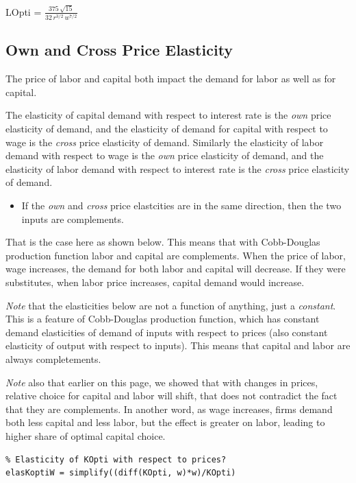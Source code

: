 \documentclass[
]{book}
\providecommand{\tightlist}{%
  \setlength{\itemsep}{0pt}\setlength{\parskip}{0pt}}
\begin{document}
LOpti = \(\displaystyle \frac{375\,\sqrt{15}}{32\,r^{3/2} \,w^{7/2} }\)

\hypertarget{own-and-cross-price-elasticity}{%
\subsection{\texorpdfstring{\textbf{Own and Cross Price Elasticity}}{Own and Cross Price Elasticity}}\label{own-and-cross-price-elasticity}}

The price of labor and capital both impact the demand for labor as well
as for capital.

The elasticity of capital demand with respect to interest rate is the
\emph{own} price elasticity of demand, and the elasticity of demand for
capital with respect to wage is the \emph{cross} price elasticity of demand.
Similarly the elasticity of labor demand with respect to wage is the
\emph{own} price elasticity of demand, and the elasticity of labor demand
with respect to interest rate is the \emph{cross} price elasticity of demand.

\begin{itemize}
\tightlist
\item
  If the \emph{own} and \emph{cross} price elastcities are in the same
  direction, then the two inputs are complements.
\end{itemize}

That is the case here as shown below. This means that with Cobb-Douglas
production function labor and capital are complements. When the price of
labor, wage increases, the demand for both labor and capital will
decrease. If they were substitutes, when labor price increases, capital
demand would increase.

\emph{Note} that the elasticities below are not a function of anything, just
a \emph{constant}. This is a feature of Cobb-Douglas production function,
which has constant demand elasticities of demand of inputs with respect
to prices (also constant elasticity of output with respect to inputs).
This means that capital and labor are always completements.

\emph{Note} also that earlier on this page, we showed that with changes in
prices, relative choice for capital and labor will shift, that does not
contradict the fact that they are complements. In another word, as wage
increases, firms demand both less capital and less labor, but the effect
is greater on labor, leading to higher share of optimal capital choice.

\begin{verbatim}
% Elasticity of KOpti with respect to prices?
elasKoptiW = simplify((diff(KOpti, w)*w)/KOpti)
\end{verbatim}
\end{document}
